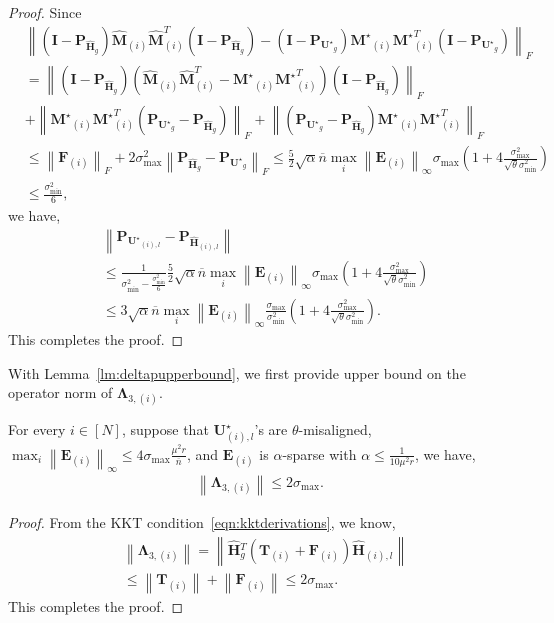 \documentclass[twoside,11pt]{article}
\newcommand{\norm}[1]{\left\lVert#1\right\rVert}
\newcommand{\matE}{\mathbf{E}}
\newcommand{\matF}{\mathbf{F}}
\newcommand{\hmatH}{{\hat{\mathbf{H}}}{}}
\newcommand{\matI}{\mathbf{I}}
\newcommand{\matMst}{{\mathbf{M}^\star}}
\newcommand{\matP}{\mathbf{P}}
\newcommand{\matT}{\mathbf{T}}
\newcommand{\matLambda}{\mathbf{\Lambda}}
\newcommand{\matU}{\mathbf{U}}
\newcommand{\matUst}{{\mathbf{U}^\star}}
\newcommand{\hmatM}{\hat{\mathbf{M}}}
\newcommand{\gop}{\sigma_{\max}}
\newcommand{\bn}{{\overline{n}}}
\newcommand{\sabnb}{\sqrt{\alpha} \bn\max_{i}\norm{\matE_{(i)}}_{\infty}}
\newcommand{\sms}{\sigma_{\min}^2}
\begin{document}
\begin{proof}
Since 
\begin{align*}
&\norm{\left(\matI-\matP_{\hmatH_g}\right)\hmatM_{(i)}\hmatM_{(i)}^T \left(\matI-\matP_{\hmatH_g}\right)-\left(\matI-\matP_{\matUst_g}\right)\matMst_{(i)}\matMst_{(i)}^T \left(\matI-\matP_{\matUst_g}\right)}_F\\
&=\norm{\left(\matI-\matP_{\hmatH_g}\right)\left(\hmatM_{(i)}\hmatM_{(i)}^T-\matMst_{(i)}\matMst_{(i)}^T\right) \left(\matI-\matP_{\hmatH_g}\right) }_F\\
&+\norm{\matMst_{(i)}\matMst_{(i)}^T\left(\matP_{\matUst_g}-\matP_{\hmatH_g}\right)}_F+\norm{\left(\matP_{\matUst_g}-\matP_{\hmatH_g}\right)\matMst_{(i)}\matMst_{(i)}^T}_F\\
&\le \norm{\matF_{(i)}}_F+2\gop^2\norm{ \matP_{\hmatH_g}-\matP_{\matUst_g}}_F\le\frac{5}{2}\sabnb\gop\left(1+4\frac{\gop^2}{\sqrt{\theta}\sms}\right)\\
&\le \frac{\sms}{6},
\end{align*}
we have,
\begin{align*}
&\norm{\matP_{\matUst_{(i),l}}-\matP_{\hmatH_{(i),l}}}\\
&\le\frac{1}{\sms-\frac{\sms}{6} }\frac{5}{2}\sabnb\gop\left(1+4\frac{\gop^2}{\sqrt{\theta}\sms}\right)\\
&\le 3\sabnb\frac{\gop}{\sms}\left(1+4\frac{\gop^2}{\sqrt{\theta}\sms}\right).
\end{align*}
This completes the proof.

\end{proof}


With Lemma~\ref{lm:deltapupperbound}, we first provide upper bound on the operator norm of $\matLambda_{3,(i)}$.
\begin{lemma}
\label{lm:eigenvalueupperbound}
For every $i\in [N]$, suppose that $\matU^\star_{(i),l}$'s are $\theta$-misaligned, $\max_i\norm{\matE_{(i)}}_{\infty}\le 4\gop\frac{\mu^2 r}{\bn}$, and $\matE_{(i)}$ is $\alpha$-sparse with $
\alpha \le \frac{1}{10\mu^2 r}$, we have,
\begin{align*}
    \norm{\matLambda_{3,(i)}}\le 2\gop.
\end{align*}    
\end{lemma}
\begin{proof}
    From the KKT condition~\eqref{eqn:kktderivations}, we know,
    \begin{align*}
    &\norm{\matLambda_{3,(i)}}= \norm{\hmatH_g^T\left(\matT_{(i)}+\matF_{(i)}\right)\hmatH_{(i),l}}\\
    &\le \norm{\matT_{(i)}} + \norm{\matF_{(i)}}\le 2\gop.
    \end{align*}
    This completes the proof.
\end{proof}
\end{document}
